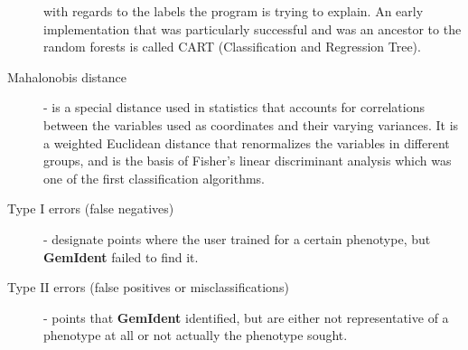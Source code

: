 \documentclass[12pt]{article}
\begin{document}
\begin{description}
with regards to the labels the program is trying to explain.
An early implementation that was particularly successful and was an ancestor
to the random forests is called CART (Classification and Regression Tree)\cite{cart}.
\item[Mahalonobis distance] - is a special distance used in statistics
that accounts for correlations between the variables used as coordinates and their varying variances.
It is a weighted Euclidean distance that renormalizes the variables in different groups, and is the basis of Fisher's linear discriminant analysis which was one of the first classification algorithms\cite{mahalanobis}.
\item[Type I errors (false negatives)] - designate points where the user trained for a certain phenotype, but {\bf GemIdent} failed to find it. 
\item[Type II errors (false positives or misclassifications)] - points that {\bf GemIdent} identified, but are either not representative of a phenotype at all or not actually the phenotype sought.
\end{description}

\end{document}
